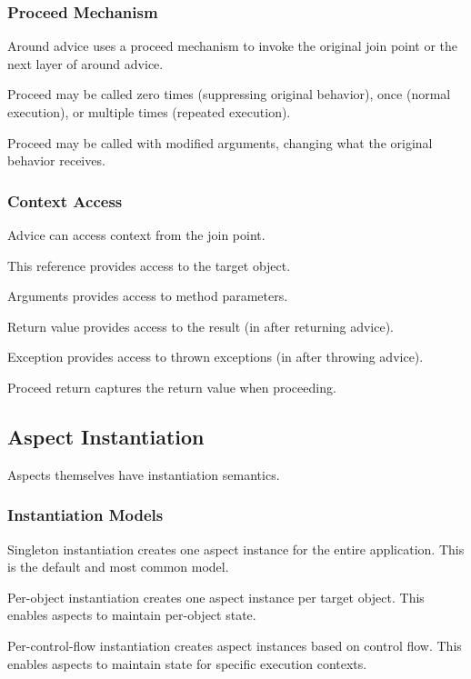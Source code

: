 \documentclass[11pt]{article}
\begin{document}
\subsubsection{Proceed Mechanism}

Around advice uses a proceed mechanism to invoke the original join point or the next layer of around advice.

Proceed may be called zero times (suppressing original behavior), once (normal execution), or multiple times (repeated execution).

Proceed may be called with modified arguments, changing what the original behavior receives.

\subsubsection{Context Access}

Advice can access context from the join point.

This reference provides access to the target object.

Arguments provides access to method parameters.

Return value provides access to the result (in after returning advice).

Exception provides access to thrown exceptions (in after throwing advice).

Proceed return captures the return value when proceeding.

\subsection{Aspect Instantiation}

Aspects themselves have instantiation semantics.

\subsubsection{Instantiation Models}

Singleton instantiation creates one aspect instance for the entire application. This is the default and most common model.

Per-object instantiation creates one aspect instance per target object. This enables aspects to maintain per-object state.

Per-control-flow instantiation creates aspect instances based on control flow. This enables aspects to maintain state for specific execution contexts.
\end{document}
